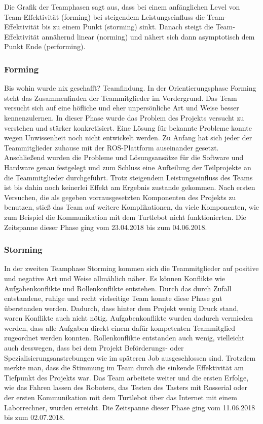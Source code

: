 \documentclass[a4paper,12pt,headsepline]{scrartcl}
\begin{document}
		Die Grafik der Teamphasen sagt aus, dass bei einem anfänglichen Level von Team-Effektivität (forming) bei steigendem Leistungseinfluss die Team-Effektivität bis zu einem Punkt (storming) sinkt. Danach steigt die Team-Effektivität annähernd linear (norming) und nähert sich dann asymptotisch dem Punkt Ende (performing). 
	\subsubsection{Forming}
		Bis wohin wurde nix geschafft? Teamfindung.
		In der Orientierungsphase Forming steht das Zusammenfinden der Teammitglieder im Vordergrund. Das Team versucht sich auf eine höfliche und eher unpersönliche Art und Weise besser kennenzulernen. In dieser Phase wurde das Problem des Projekts versucht zu verstehen und stärker konkretisiert. Eine Lösung für bekannte Probleme konnte wegen Unwissenheit noch nicht entwickelt werden. Zu Anfang hat sich jeder der Teammitglieder zuhause mit der ROS-Plattform auseinander gesetzt. Anschließend wurden die Probleme und Lösungsansätze für die Software und Hardware genau festgelegt und zum Schluss eine Aufteilung der Teilprojekte an die Teammitglieder durchgeführt. Trotz steigendem Leistungseinfluss des Teams ist bis dahin noch keinerlei Effekt am Ergebnis zustande gekommen. Nach ersten Versuchen, die als gegeben vorrausgesetzten Komponenten des Projekts zu benutzen, stieß das Team auf weitere Komplikationen, da viele Komponenten, wie zum Beispiel die Kommunikation mit dem Turtlebot nicht funktionierten. Die Zeitspanne dieser Phase ging vom 23.04.2018 bis zum 04.06.2018. 
	\subsubsection{Storming}
		In der zweiten Teamphase Storming kommen sich die Teammitglieder auf positive und negative Art und Weise allmählich näher. Es können Konflikte wie Aufgabenkonflikte und Rollenkonflikte entstehen. Durch das durch Zufall entstandene, ruhige und recht vielseitige Team konnte diese Phase gut überstanden werden. Dadurch, dass hinter dem Projekt wenig Druck stand, waren Konflikte auch nicht nötig. Aufgabenkonflikte wurden dadurch vermieden werden, dass alle Aufgaben direkt einem dafür kompetenten Teammitglied zugeordnet werden konnten. Rollenkonflikte entstanden auch wenig, vielleicht auch desswegen, dass bei dem Projekt Beförderungs- oder Spezialisierungsanstrebungen wie im späteren Job ausgeschlossen sind. Trotzdem merkte man, dass die Stimmung im Team durch die sinkende Effektivität am Tiefpunkt des Projekts war. Das Team arbeitete weiter und die ersten Erfolge, wie das Fahren lassen des Roboters, das Testen des Tasters mit Rosserial oder der ersten Kommunikation mit dem Turtlebot über das Internet mit einem Laborrechner, wurden erreicht. Die Zeitspanne dieser Phase ging vom 11.06.2018 bis zum 02.07.2018.
\end{document}
